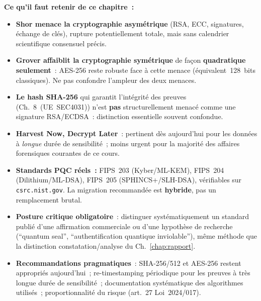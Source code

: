 \separateur

\begin{boxresume}
\textbf{Ce qu'il faut retenir de ce chapitre~:}
\begin{itemize}
    \item \textbf{Shor menace la cryptographie asymétrique}
          (RSA, ECC, signatures, échange de clés), rupture
          potentiellement totale, mais sans calendrier scientifique
          consensuel précis.

    \item \textbf{Grover affaiblit la cryptographie symétrique}
          de façon \textbf{quadratique seulement}~: AES-256 reste
          robuste face à cette menace (équivalent~128~bits classiques).
          Ne pas confondre l'ampleur des deux menaces.

    \item \textbf{Le hash SHA-256} qui garantit l'intégrité des
          preuves (Ch.~8~(UE~SEC4031)) n'est \textbf{pas}
          structurellement menacé comme une signature RSA/ECDSA~:
          distinction essentielle souvent confondue.

    \item \textbf{Harvest Now, Decrypt Later}~: pertinent dès
          aujourd'hui pour les données à \emph{longue} durée de
          sensibilité~; moins urgent pour la majorité des affaires
          forensiques courantes de ce cours.

    \item \textbf{Standards PQC réels~:} FIPS~203 (Kyber/ML-KEM),
          FIPS~204 (Dilithium/ML-DSA), FIPS~205 (SPHINCS+/SLH-DSA), vérifiables sur \texttt{csrc.nist.gov}. La migration
          recommandée est \textbf{hybride}, pas un remplacement brutal.

    \item \textbf{Posture critique obligatoire}~: distinguer
          systématiquement un standard publié d'une affirmation
          commerciale ou d'une hypothèse de recherche
          (``quantum seal'', ``authentification quantique
          inviolable''), même méthode que la distinction
          constatation/analyse du Ch.~\ref{chap:rapport}.

    \item \textbf{Recommandations pragmatiques}~: SHA-256/512
          et AES-256 restent appropriés aujourd'hui~; re-timestamping
          périodique pour les preuves à très longue durée de
          sensibilité~; documentation systématique des algorithmes
          utilisés~; proportionnalité du risque (art.~27
          Loi~2024/017).
\end{itemize}
\end{boxresume}

